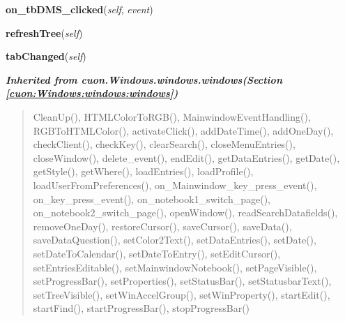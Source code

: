 \hspace{.8\funcindent}\begin{boxedminipage}{\funcwidth}

    \raggedright \textbf{on\_tbDMS\_clicked}(\textit{self}, \textit{event})

\setlength{\parskip}{2ex}
\setlength{\parskip}{1ex}
    \end{boxedminipage}

    \label{cuon:Think:think:thinkwindow:refreshTree}

    \vspace{0.5ex}

\hspace{.8\funcindent}\begin{boxedminipage}{\funcwidth}

    \raggedright \textbf{refreshTree}(\textit{self})

\setlength{\parskip}{2ex}
\setlength{\parskip}{1ex}
    \end{boxedminipage}

    \label{cuon:Think:think:thinkwindow:tabChanged}

    \vspace{0.5ex}

\hspace{.8\funcindent}\begin{boxedminipage}{\funcwidth}

    \raggedright \textbf{tabChanged}(\textit{self})

\setlength{\parskip}{2ex}
\setlength{\parskip}{1ex}
    \end{boxedminipage}


\large{\textbf{\textit{Inherited from cuon.Windows.windows.windows\textit{(Section \ref{cuon:Windows:windows:windows})}}}}

\begin{quote}
CleanUp(), HTMLColorToRGB(), MainwindowEventHandling(), RGBToHTMLColor(), activateClick(), addDateTime(), addOneDay(), checkClient(), checkKey(), clearSearch(), closeMenuEntries(), closeWindow(), delete\_event(), endEdit(), getDataEntries(), getDate(), getStyle(), getWhere(), loadEntries(), loadProfile(), loadUserFromPreferences(), on\_Mainwindow\_key\_press\_event(), on\_key\_press\_event(), on\_notebook1\_switch\_page(), on\_notebook2\_switch\_page(), openWindow(), readSearchDatafields(), removeOneDay(), restoreCursor(), saveCursor(), saveData(), saveDataQuestion(), setColor2Text(), setDataEntries(), setDate(), setDateToCalendar(), setDateToEntry(), setEditCursor(), setEntriesEditable(), setMainwindowNotebook(), setPageVisible(), setProgressBar(), setProperties(), setStatusBar(), setStatusbarText(), setTreeVisible(), setWinAccelGroup(), setWinProperty(), startEdit(), startFind(), startProgressBar(), stopProgressBar()
\end{quote}


